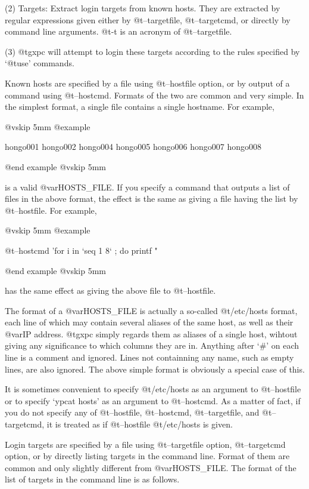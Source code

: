 (2) Targets: Extract login targets from known hosts. They are
extracted by regular expressions given either by @t{--targetfile},
@t{--targetcmd}, or directly by command line arguments. @t{-t} is
an acronym of @t{--targetfile}.

(3) @t{gxpc} will attempt to login these targets according to the
rules specified by `@t{use}' commands.

Known hosts are specified by a file using @t{--hostfile} option, or
by output of a command using @t{--hostcmd}. Formats of the two are
common and very simple. In the simplest format, a single file
contains a single hostname. For example,

@vskip 5mm
@example

   hongo001
   hongo002
   hongo004
   hongo005
   hongo006
   hongo007
   hongo008

@end example
@vskip 5mm

is a valid @var{HOSTS_FILE}. If you specify a command that outputs
a list of files in the above format, the effect is the same
as giving a file having the list by @t{--hostfile}. For example,

@vskip 5mm
@example

  @t{--hostcmd} 'for i in `seq 1 8` ; do printf "%

@end example
@vskip 5mm

has the same effect as giving the above file to @t{--hostfile}.

The format of a @var{HOSTS_FILE} is actually a so-called @t{/etc/hosts}
format, each line of which may contain several aliases of the
same host, as well as their @var{IP} address. @t{gxpc} simply regards them
as aliases of a single host, wihtout giving any significance to
which columns they are in. Anything after `#' on each line is a
comment and ignored. Lines not containning any name, such as
empty lines, are also ignored.  The above simple format is
obviously a special case of this.

It is sometimes convenient to specify @t{/etc/hosts} as an argument
to @t{--hostfile} or to specify `ypcat hosts' as an argument to
@t{--hostcmd}. As a matter of fact, if you do not specify any of
@t{--hostfile}, @t{--hostcmd}, @t{--targetfile}, and @t{--targetcmd}, it is
treated as if @t{--hostfile} @t{/etc/hosts} is given.

Login targets are specified by a file using @t{--targetfile} option,
@t{--targetcmd} option, or by directly listing targets in the command
line. Format of them are common and only slightly different from
@var{HOSTS_FILE}.  The format of the list of targets in the command
line is as follows.

